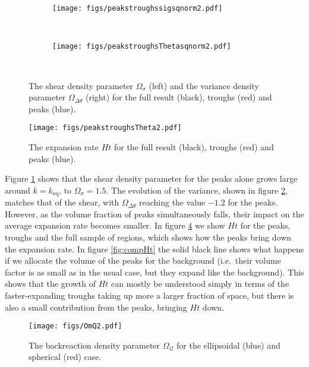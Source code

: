 \documentclass[11pt, a4paper]{article}
\newcommand{\fig}[1]{figure \ref{#1}}
\newcommand{\keq}{k_{\mathrm{eq}}}
\newcommand{\ie}{i.e.\ }
\newcommand{\sQ}{\mathcal{Q}}
\newcommand{\OQ}{\Omega_{\sQ}}
\newcommand{\Ov}{\Omega_{\Delta\theta}}
\begin{document}
\begin{figure}[t]
  \centering

  \begin{subfigure}[b]{0.48\textwidth}
    \texttt{[image: figs/peakstroughssigsqnorm2.pdf]}
    \caption{}
    \label{fig:troughpeaksig}
  \end{subfigure}
  ~
  \begin{subfigure}[b]{0.48\textwidth}
    \texttt{[image: figs/peakstroughsThetasqnorm2.pdf]}
    \caption{}
    \label{fig:troughpeakvar}
  \end{subfigure}
  \\

  \caption{The shear density parameter $\Omega_\sigma$ (left) and the
    variance density parameter $\Ov$ (right) for the full result
    (black), troughs (red) and peaks (blue).}
  \label{fig:troughpeaksig_troughpeakvar}
\end{figure}

\begin{figure}[t]
  \centering
  \texttt{[image: figs/peakstroughsTheta2.pdf]} \\
  \caption{The expansion rate $Ht$ for the full result (black),
    troughs (red) and peaks (blue).}
  \label{fig:troughpeakHt}
\end{figure}

Figure \ref{fig:troughpeaksig} shows that the shear density parameter for the peaks alone grows large around $k=\keq$, to $\Omega_\sigma=1.5$. The evolution of the variance, shown in \fig{fig:troughpeakvar}, matches that of the shear, with $\Ov$ reaching the value $-1.2$ for the peaks. However, as the volume fraction of peaks simultaneously falls, their impact on the average expansion rate becomes smaller. In \fig{fig:troughpeakHt} we show $Ht$ for the peaks, troughs and the full sample of regions, which shows how the peaks bring down the expansion rate. In \fig{fig:compHt} the solid black line shows what happens if we allocate the volume of the peaks for the background (\ie their volume factor is as small as in the usual case, but they expand like the background).
This shows that the growth of $Ht$ can mostly be understood simply in terms of the faster-expanding troughs taking up more a larger fraction of space, but there is also a small contribution from the peaks, bringing $Ht$ down.

\begin{figure}[t]
  \centering
  \texttt{[image: figs/OmQ2.pdf]} \\
  \caption{The backreaction density parameter $\OQ$ for the
    ellipsoidal (blue) and spherical (red) case.}
  \label{fig:OQ}
\end{figure}
\end{document}
